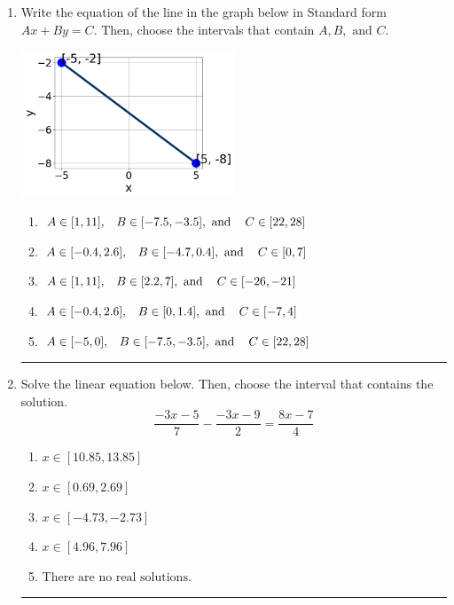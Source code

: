 \documentclass[14pt]{extbook}
\newcommand{\litem}[1]{\item#1\hspace*{-1cm}\rule{\textwidth}{0.4pt}}
\begin{document}
\begin{enumerate}
{\begin{enumerate}[label=\Alph*.]
\end{enumerate} }
\litem{
Write the equation of the line in the graph below in Standard form $Ax+By=C$. Then, choose the intervals that contain $A, B, \text{ and } C$.
\begin{center}
    \includegraphics[width=0.5\textwidth]{../Figures/linearGraphToStandardCopyB.png}
\end{center}
\begin{enumerate}[label=\Alph*.]
\item \( A \in [1, 11], \hspace{3mm} B \in [-7.5, -3.5], \text{ and } \hspace{3mm} C \in [22, 28] \)
\item \( A \in [-0.4, 2.6], \hspace{3mm} B \in [-4.7, 0.4], \text{ and } \hspace{3mm} C \in [0, 7] \)
\item \( A \in [1, 11], \hspace{3mm} B \in [2.2, 7], \text{ and } \hspace{3mm} C \in [-26, -21] \)
\item \( A \in [-0.4, 2.6], \hspace{3mm} B \in [0, 1.4], \text{ and } \hspace{3mm} C \in [-7, 4] \)
\item \( A \in [-5, 0], \hspace{3mm} B \in [-7.5, -3.5], \text{ and } \hspace{3mm} C \in [22, 28] \)

\end{enumerate} }
\litem{
Solve the linear equation below. Then, choose the interval that contains the solution.\[ \frac{-3x -5}{7} - \frac{-3x -9}{2} = \frac{8x -7}{4} \]\begin{enumerate}[label=\Alph*.]
\item \( x \in [10.85, 13.85] \)
\item \( x \in [0.69, 2.69] \)
\item \( x \in [-4.73, -2.73] \)
\item \( x \in [4.96, 7.96] \)
\item \( \text{There are no real solutions.} \)


\end{enumerate}}
\end{enumerate}
\end{document}
